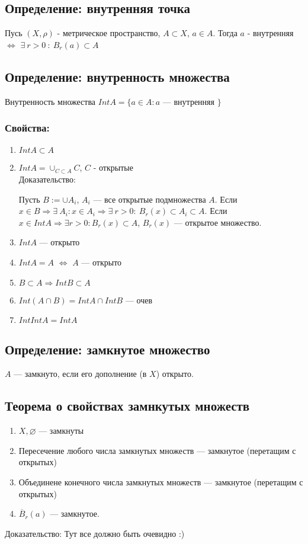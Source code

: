 \documentclass[12pt]{report} %
\begin{document}
\subsection*{Определение: внутренняя точка}
Пусь $(X, \rho)$ - метрическое пространство, $A \subset X$, $a \in A$. Тогда $a$ - внутренняя $\Leftrightarrow$ $\exists \ r > 0 \ : \ B_r(a) \subset A$

\subsection*{Определение: внутренность множества}
Внутренность множества $Int A = \{a \in A : a$ ---	 внутренняя $\}$

\subsubsection*{Свойства:}
\begin{enumerate}
\item	$Int A \subset A$
\item $Int A = \cup_{C \subset A}C$, $C$ - открытые\\
Доказательство:

Пусть $B := \cup{A_i}$, $A_i$ --- все открытые подмножества $A$. Если $x \in B \Rightarrow \exists \ A_i : x \in A_i \Rightarrow \exists \ r > 0 : \  B_r(x) \subset A_i \subset A$. Если $x \in Int A \Rightarrow \exists r > 0 : B_r(x) \subset A$, $B_r(x)$ --- открытое множество.
\item $Int A	$ --- открыто
\item $Int A = A$ $\Leftrightarrow$ $A$ --- открыто
\item $B \subset A \Rightarrow Int B \subset A$
\item $Int (A \cap B) = Int A \cap Int B$ --- очев
\item $IntIntA = IntA$
\end{enumerate}

\subsection*{Определение: замкнутое множество}
$A$ --- замкнуто, если его дополнение (в $X$) открыто.

\subsection*{Теорема о свойствах замнкутых множеств}
\begin{enumerate}
\item $X, \varnothing$ --- замкнуты
\item Пересечение любого числа замкнутых множеств --- замкнутое (перетащим с открытых)
\item Объединене конечного числа замкнутых множеств --- замкнутое (перетащим с открытых)
\item $\overline{B}_r(a)$ --- замкнутое.
\end{enumerate}
Доказательство:
Тут все должно быть очевидно :)
\end{document}
